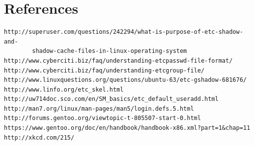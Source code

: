 \documentclass{article}
\begin{document}
\section*{References}
\begin{verbatim}
http://superuser.com/questions/242294/what-is-purpose-of-etc-shadow-and-
        shadow-cache-files-in-linux-operating-system
http://www.cyberciti.biz/faq/understanding-etcpasswd-file-format/
http://www.cyberciti.biz/faq/understanding-etcgroup-file/
http://www.linuxquestions.org/questions/ubuntu-63/etc-gshadow-681676/
http://www.linfo.org/etc_skel.html
http://uw714doc.sco.com/en/SM_basics/etc_default_useradd.html
http://man7.org/linux/man-pages/man5/login.defs.5.html
http://forums.gentoo.org/viewtopic-t-805507-start-0.html
https://www.gentoo.org/doc/en/handbook/handbook-x86.xml?part=1&chap=11
http://xkcd.com/215/
\end{verbatim}
\end{document}
